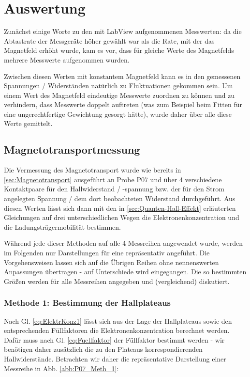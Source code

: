 \section{Auswertung}\label{sec:Auswertung}

Zunächst einige Worte zu den mit LabView aufgenommenen Messwerten: da die Abtastrate der Messgeräte höher gewählt war als die Rate, mit der das Magnetfeld erhöht wurde, kam es vor, dass für gleiche Werte des Magnetfelds mehrere Messwerte aufgenommen wurden.

Zwischen diesen Werten mit konstantem Magnetfeld kann es in den gemessenen Spannungen / Widerständen natürlich zu Fluktuationen gekommen sein. Um einem Wert des Magnetfeld eindeutige Messwerte zuordnen zu können und zu verhindern, dass Messwerte doppelt auftreten (was zum Beispiel beim Fitten für eine ungerechtfertige Gewichtung gesorgt hätte), wurde daher über alle diese Werte gemittelt.

\subsection{Magnetotransportmessung}\label{sec:Mag_trans}
Die Vermessung des Magnetotransport wurde wie bereits in \autoref{sec:Magnetotransport} ausgeführt an Probe P07 und über 4 verschiedene Kontaktpaare für den Hallwiderstand / -spannung bzw. der für den Strom angelegten Spannung / dem dort beobachteten Widerstand durchgeführt. Aus diesen Werten lässt sich dann mit den in \autoref{sec:Quanten-Hall-Effekt} erläuterten Gleichungen auf drei unterschiedlichen Wegen die Elektronenkonzentration und die Ladungsträgermobilität bestimmen. 

Während jede dieser Methoden auf alle 4 Messreihen angewendet wurde, werden im Folgenden nur Darstellungen für eine repräsentativ angeführt. Die Vorgehensweisen lassen sich auf die Übrigen Reihen ohne nennenswerten Anpassungen übertragen - auf Unterschiede wird eingegangen. Die so bestimmten Größen werden für alle Messreihen angegeben und (vergleichend) diskutiert.

\subsubsection{Methode 1: Bestimmung der Hallplateaus}
Nach Gl. \ref{eq:ElektrKonz1} lässt sich aus der Lage der Hallplateaus sowie den entsprechenden Füllfaktoren die Elektronenkonzentration berechnet werden. Dafür muss nach Gl. \ref{eq:Fuellfaktor} der Füllfaktor bestimmt werden - wir benötigen daher zusätzlich die zu den Plateaus korrespondierenden Hallwiderstände.  Betrachten wir daher die repräsentative Darstellung einer Messreihe in Abb. \ref{abb:P07_Meth_1}:

